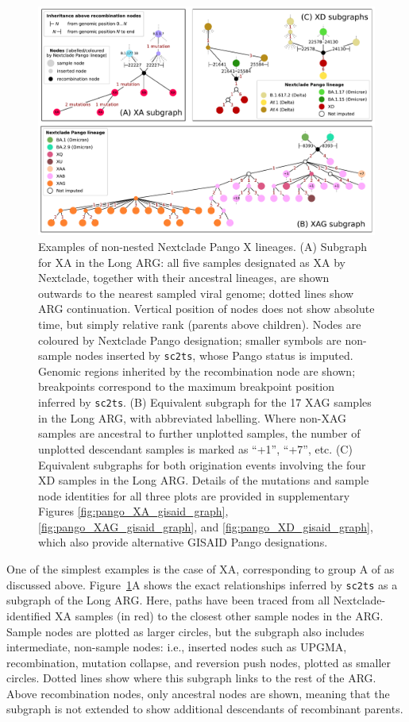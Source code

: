 \documentclass{article}
\begin{document}
\begin{figure}
\centering
\includegraphics[width=\textwidth]{figures/Pango_XA_XAG_XD_nxcld_tight_graph.pdf}

\caption{\label{fig:pango-simple-origin-graph} Examples of non-nested
Nextclade Pango X lineages. (A) Subgraph for XA in the Long ARG: all five samples designated
as XA by Nextclade, together with their ancestral lineages, are shown outwards to the nearest
sampled viral genome; dotted lines show ARG continuation. Vertical position of nodes does not
show absolute time, but simply relative rank (parents above children). Nodes are coloured by Nextclade
Pango designation; smaller symbols are non-sample nodes inserted by \texttt{sc2ts}, whose
Pango status is imputed. Genomic regions inherited by the recombination node are shown;
breakpoints correspond to the maximum breakpoint position inferred by \texttt{sc2ts}.
(B) Equivalent subgraph for the 17 XAG samples in the Long ARG, with abbreviated labelling. Where
non-XAG samples are ancestral to further unplotted samples, the number of unplotted descendant samples
is marked as ``+1'', ``+7'', etc.
(C) Equivalent subgraphs for both origination events involving the four XD samples in the Long ARG.
Details of the mutations and sample node identities for all three plots are provided in
supplementary Figures \ref{fig:pango_XA_gisaid_graph}, \ref{fig:pango_XAG_gisaid_graph}, and \ref{fig:pango_XD_gisaid_graph}, which also provide alternative GISAID Pango designations.
} \end{figure}

One of the simplest examples is the case of XA, corresponding to group A
of \citet{Jackson2021-ik} as discussed above. Figure~\ref{fig:pango-simple-origin-graph}A
shows the exact relationships inferred by \texttt{sc2ts} as a subgraph of the Long ARG.
Here, paths have been traced from all
Nextclade-identified XA samples (in red) to the closest other sample nodes in the ARG.
Sample nodes are plotted as larger circles, but the subgraph also includes intermediate,
non-sample nodes: i.e., inserted nodes such as UPGMA, recombination, mutation collapse, and
reversion push nodes, plotted as smaller circles. Dotted lines show where this subgraph links
to the rest of the ARG. Above recombination nodes, only ancestral nodes are shown, meaning
that the subgraph is not extended to show additional descendants of recombinant parents.
\end{document}

